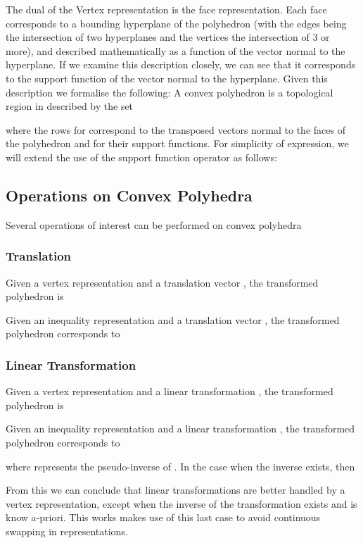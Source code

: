 \documentclass{IEEEtran}
\begin{document}
The dual of the Vertex representation is the face representation. Each face corresponds to a bounding hyperplane
of the polyhedron (with the edges being the intersection of two hyperplanes and the vertices the intersection of 3 or
more), and described mathematically as a function of the vector normal to the hyperplane.
If we examine this description closely, we can see that it corresponds to the support function of the vector normal
to the hyperplane.
Given this description we formalise the following:
A convex polyhedron is a topological region in  described by the set 

where the rows  for  correspond to the transposed vectors normal to the faces of the polyhedron and
 for  their support functions.
For simplicity of expression, we will extend the use of the support function operator as follows:


\subsection{Operations on Convex Polyhedra} \label{sec:convex_polyhedra_ops}


Several operations of interest can be performed on convex polyhedra
\subsubsection{Translation} \label{sec:convex_translation}
Given a vertex representation  and a translation vector , the transformed polyhedron is

Given an inequality representation  and a translation vector , the transformed polyhedron corresponds to


\subsubsection{Linear Transformation} \label{sec:convex_transform}
Given a vertex representation  and a linear transformation , the transformed polyhedron is

Given an inequality representation  and a linear transformation ,
the transformed polyhedron corresponds to

where  represents the pseudo-inverse of . In the case when the inverse  exists, then

From this we can conclude that linear transformations are better handled by a vertex representation, except when the inverse of the transformation exists and is know a-priori. This works makes use of this last case to avoid continuous swapping in representations.
\end{document}
